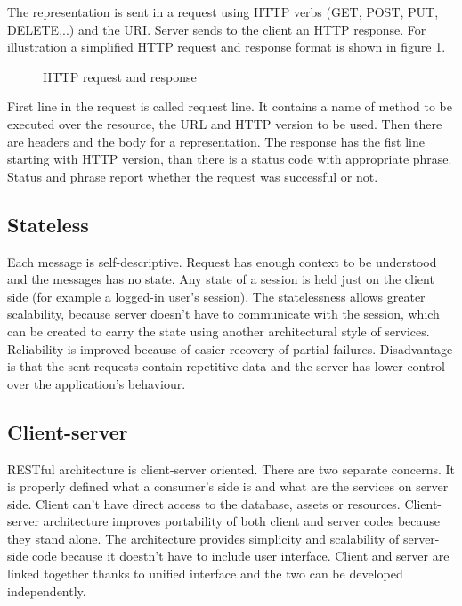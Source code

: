 The representation is sent in a request using HTTP verbs (GET, POST, PUT, DELETE,..) and the URI. Server sends to the client an HTTP response. For illustration a simplified HTTP request and response format is shown in figure \ref{fig:http}.

\begin{figure}[htp] 
\caption{HTTP request and response}
\label{fig:http}
\end{figure} 

First line in the request is called request line. It contains a name of method to be executed over the resource, the URL and HTTP version to be used. Then there are headers and the body for a representation. The response has the fist line starting with HTTP version, than there is a status code with appropriate phrase. Status and phrase report whether the request was successful or not.

\subsection{Stateless}
  
Each message is self-descriptive. Request has enough context to be understood and the messages has no state. Any state of a \gls{session} is held just on the client side (for example a logged-in user's session).
The statelessness allows greater scalability, because server doesn't have to communicate with the session, which can be created to carry the state using another architectural style of services. Reliability is improved because of easier recovery of partial failures. Disadvantage is that the sent requests contain repetitive data and the server has lower control over the application's behaviour.

\subsection{Client-server}

RESTful architecture is client-server oriented. There are two separate concerns. It is properly defined what a consumer's side is and what are the services on server side. Client can’t have direct access to the database, assets or resources. Client-server architecture improves portability of both client and server codes because they stand alone. The architecture provides simplicity and scalability of server-side code because it doestn't have to include user interface. Client and server are linked together thanks to unified interface and the two can be developed independently.

